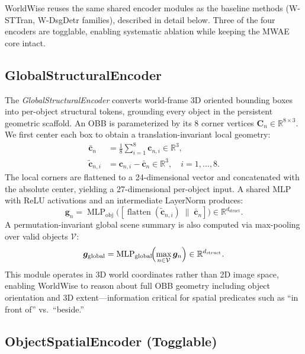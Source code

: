 \documentclass{article}
\newcommand{\mR}{\mathbb{R}}
\newcommand{\op}[1]{\operatorname{#1}}
\newcommand{\mat}[1]{\bm{#1}}
\begin{document}
WorldWise reuses the same shared encoder modules as the baseline methods (W-STTran, W-DsgDetr families), described in detail below.  Three of the four encoders are togglable, enabling systematic ablation while keeping the MWAE core intact.

\subsection{GlobalStructuralEncoder}

The \emph{GlobalStructuralEncoder} converts world-frame 3D oriented bounding boxes into per-object structural tokens, grounding every object in the persistent geometric scaffold.  An OBB is parameterized by its $8$ corner vertices $\mat{C}_n \in \mR^{8 \times 3}$.  We first center each box to obtain a translation-invariant local geometry:
\begin{align}
    \bar{\mat{c}}_n &= \frac{1}{8}\sum_{i=1}^{8}\mat{c}_{n,i} \in \mR^{3}, \label{eq:center} \\
    \tilde{\mat{c}}_{n,i} &= \mat{c}_{n,i} - \bar{\mat{c}}_n \in \mR^{3}, \quad i=1,\dots,8. \label{eq:local}
\end{align}
The local corners are flattened to a 24-dimensional vector and concatenated with the absolute center, yielding a 27-dimensional per-object input.  A shared MLP with ReLU activations and an intermediate LayerNorm produces:
\begin{equation}
    \mat{g}_n = \op{MLP}_{\text{obj}}\bigl([\op{flatten}(\tilde{\mat{c}}_{n,i}) \;\|\; \bar{\mat{c}}_n]\bigr) \in \mR^{d_{\text{struct}}}.
    \label{eq:gse}
\end{equation}
A permutation-invariant global scene summary is also computed via max-pooling over valid objects $\mathcal{V}$:
\begin{equation}
    \mat{g}_{\text{global}} = \op{MLP}_{\text{global}}\!\Bigl(\max_{n \in \mathcal{V}} \mat{g}_n\Bigr) \in \mR^{d_{\text{struct}}}.
    \label{eq:gse_global}
\end{equation}
This module operates in 3D world coordinates rather than 2D image space, enabling WorldWise to reason about full OBB geometry including object orientation and 3D extent---information critical for spatial predicates such as ``in front of'' vs.\ ``beside.''

\subsection{ObjectSpatialEncoder (Togglable)}
\end{document}
